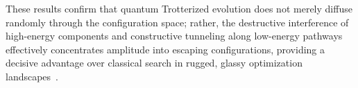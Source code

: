 These results confirm that quantum Trotterized evolution does not merely diffuse randomly through the configuration space; rather, the destructive interference of high-energy components and constructive tunneling along low-energy pathways effectively concentrates amplitude into escaping configurations, providing a decisive advantage over classical search in rugged, glassy optimization landscapes~\cite{marinari1994, bapst2013}.
